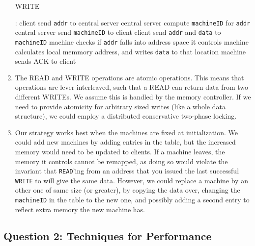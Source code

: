 \documentclass[11pt,a4paper,english]{article}
\begin{document}
\begin{enumerate}
\begin{algorithm}[H]
\caption{WRITE}
\begin{algorithmic}[1]
:
\State client send \texttt{addr} to central server
\State central server compute \texttt{machineID} for \texttt{addr}
\State central server send \texttt{machineID} to client
\smallskip
\State client send \texttt{addr} and \texttt{data} to \texttt{machineID}
\State machine checks if \texttt{addr} falls into address space it controls
\State machine calculates local memmory address, and writes \texttt{data} to that location
\State machine sends ACK to client
\EndProcedure
\end{algorithmic}
\end{algorithm}

\item The READ and WRITE operations are atomic operations. This means that
  operations are lever interleaved, such that a READ can return data from two
  different WRITEs. We assume this is handled by the memory controller. If we
  need to provide atomicity for arbitrary sized writes (like a whole data
  structure), we could employ a distributed conservative two-phase locking.

\item Our strategy works best when the machines are fixed at initialization. We
  could add new machines by adding entries in the table, but the increased
  memory would need to be updated to clients. If a machine leaves, the memory it
  controls cannot be remapped, as doing so would violate the invariant that
  \texttt{READ}'ing from an address that you issued the last successful
  \texttt{WRITE} to will give the same data. However, we could replace a machine
  by an other one of same size (or greater), by copying the data over, changing
  the \texttt{machineID} in the table to the new one, and possibly adding a
  second entry to reflect extra memory the new machine has.

\end{enumerate}



\subsection{Question 2: Techniques for Performance}
\end{document}
